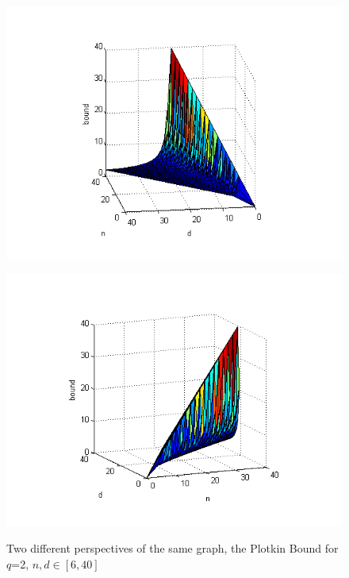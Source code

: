 \documentclass{article}
\theoremstyle{plain}
\theoremstyle{definition}
\begin{document}
\begin{figure}
\centering
\begin{minipage}[b]{0.45\linewidth}
\includegraphics[width=1.4\linewidth]{plotkin.png}
\label{fig:minipage1}
\end{minipage}
\quad
\begin{minipage}[b]{0.45\linewidth}
\includegraphics[width=1.4\linewidth]{plotkin_2.png}
\label{fig:minipage2}
\end{minipage}
\caption{Two different perspectives of the same graph, the Plotkin Bound for $q$=2, $n,d\in[6,40]$ }
\end{figure}
\end{document}
